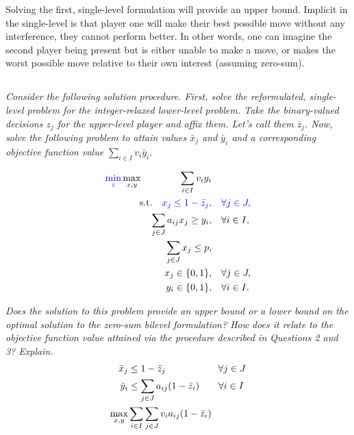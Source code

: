 \documentclass[12pt]{amsart}
\begin{document}
Solving the first, single-level formulation will provide an upper bound. 
Implicit in the single-level is that player one will make their best
possible move without any interference, they cannot perform better.
In other words, one can imagine the second player being present but is either unable to make a move, 
or makes the worst possible move relative to their own interest (assuming zero-sum). \\


\subsection{}
\textit{Consider the following solution procedure. First, solve the reformulated, single-level
	problem for the integer-relaxed lower-level problem. Take the binary-valued decisions $z_j$
	for the upper-level player and affix them. Let’s call them $\bar z_j$. Now, solve the following
	problem to attain values $\bar x_j$ and $\bar y_i$ and a corresponding objective function 
	value $\sum_{i\in I}v_i\bar y_i$.}

	\begin{align*}
		{\color{blue}\min_z}\max_{x,y} \qquad\qquad \sum_{i\in I} v_iy_i& \\
		\text{s.t.}\quad
		{\color{blue} x_j \leq 1-\bar z_j,}& \quad {\color{blue}\forall j\in J,}\\
		\sum_{j\in J} a_{ij}x_j \geq y_i,& \quad \forall i\in I, \\
		\sum_{j\in J} x_j \leq p,& \\
		x_j \in \{0,1\},& \quad \forall j\in J, \\
		y_i \in \{0,1\},& \quad \forall i\in I. \\
	\end{align*}

\textit{Does the solution to this problem provide an upper bound or a lower bound on the optimal
	solution to the zero-sum bilevel formulation? How does it relate to the objective function
	value attained via the procedure described in Questions 2 and 3? Explain.} \\
	
	\begin{align*} 
		\bar x_j &\leq 1 - \bar z_j \hspace{5.5em} \forall j\in J \\
		\bar y_i &\leq \sum_{j\in J} a_{ij}(1-\bar z_{i}) \hspace{2em}  \forall i\in I \\
		\max_{x,y}& \sum_{i\in I} \sum_{j\in J} v_i a_{ij}(1-\bar z_{i}) \\
	\end{align*}
\end{document}

